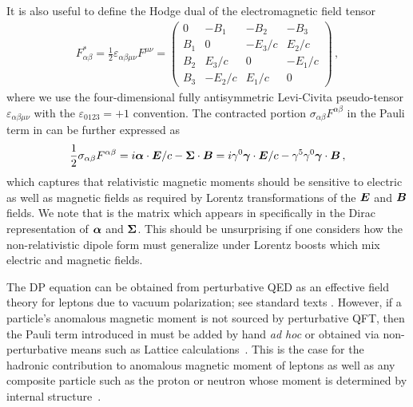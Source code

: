 It is also useful to define the Hodge dual of the electromagnetic field tensor
\begin{gather}
    \label{em:2}
    F_{\alpha\beta}^{*} = \frac{1}{2}\varepsilon_{\alpha\beta\mu\nu}F^{\mu\nu} = 
    \begin{pmatrix}
        0        & -B_{1}  & -B_{2}  & -B_{3}\\
        B_{1}  & 0         & -E_{3}/c    & E_{2}/c\\
        B_{2}  & E_{3}/c     & 0         & -E_{1}/c\\
        B_{3}  & -E_{2}/c    & E_{1}/c     & 0
    \end{pmatrix}\,,
\end{gather}
where we use the four-dimensional fully antisymmetric Levi-Civita pseudo-tensor $\varepsilon_{\alpha\beta\mu\nu}$ with the $\varepsilon_{0123}=+1$ convention. The contracted portion $\sigma_{\alpha\beta}F^{\alpha\beta}$ in the Pauli term in  can be further expressed as
\begin{alignat}{1}
	\label{dp:2} \frac{1}{2}\sigma_{\alpha\beta}F^{\alpha\beta} = i\boldsymbol{\alpha}\cdot\boldsymbol{E}/c-\boldsymbol{\Sigma}\cdot\boldsymbol{B} = i\gamma^{0}\boldsymbol{\gamma}\cdot\boldsymbol{E}/c-\gamma^{5}\gamma^{0}\boldsymbol{\gamma}\cdot\boldsymbol{B}\,,
\end{alignat}
which captures that relativistic magnetic moments should be sensitive to electric as well as magnetic fields as required by Lorentz transformations of the $\boldsymbol{E}$ and $\boldsymbol{B}$ fields. We note that  is the matrix which appears in  specifically in the Dirac representation of $\boldsymbol{\alpha}$ and $\boldsymbol{\Sigma}$. This should be unsurprising if one considers how the non-relativistic dipole form must generalize under Lorentz boosts which mix electric and magnetic fields.

The DP equation can be obtained from perturbative QED as an effective field theory for leptons due to vacuum polarization; see standard texts \cite{Itzykson:1980rh,Schwartz:2014sze}. However, if a particle's anomalous magnetic moment is not sourced by perturbative QFT, then the Pauli term introduced in  must be added by hand \emph{ad hoc} or obtained via non-perturbative means such as Lattice calculations~\citep{Aoyama:2020ynm}. This is the case for the hadronic contribution to anomalous magnetic moment of leptons as well as any composite particle such as the proton or neutron whose moment is determined by internal structure~\citep{Proceedings:2012ulb,Green:2015wqa}.

